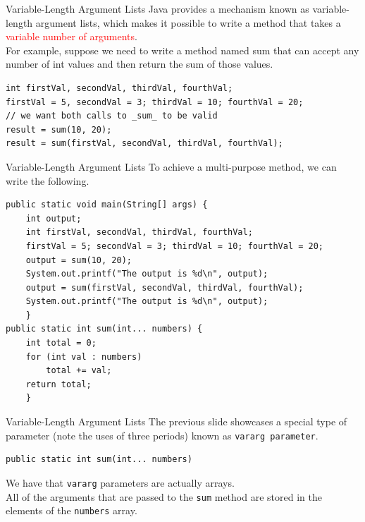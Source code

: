 \documentclass[11pt]{beamer}
\newcommand{\red}[1]{\textcolor{red}{#1}}
\begin{document}
\begin{frame}[fragile]
{Variable-Length Argument Lists}
    Java provides a mechanism known as variable-length argument lists, which makes it possible to write a method that takes a \red{variable number of arguments}. \\ \vspace{1em}
    For example, suppose we need to write a method named sum that can accept any number of int values and then return the sum of those values.
    \begin{lstlisting}
int firstVal, secondVal, thirdVal, fourthVal;
firstVal = 5, secondVal = 3; thirdVal = 10; fourthVal = 20;
// we want both calls to _sum_ to be valid
result = sum(10, 20);
result = sum(firstVal, secondVal, thirdVal, fourthVal);
    \end{lstlisting}
\end{frame}

\begin{frame}[fragile]
{Variable-Length Argument Lists}
    To achieve a multi-purpose method, we can write the following.
    \begin{lstlisting}[basicstyle=\ttfamily\footnotesize]
public static void main(String[] args) {
    int output;
    int firstVal, secondVal, thirdVal, fourthVal;
    firstVal = 5; secondVal = 3; thirdVal = 10; fourthVal = 20;
    output = sum(10, 20);
    System.out.printf("The output is %d\n", output);
    output = sum(firstVal, secondVal, thirdVal, fourthVal);
    System.out.printf("The output is %d\n", output);
    }
public static int sum(int... numbers) {
    int total = 0;
    for (int val : numbers)
        total += val;
    return total;
    }
    \end{lstlisting}
\end{frame}

\begin{frame}[fragile]
{Variable-Length Argument Lists}
    The previous slide showcases a special type of parameter (note the uses of three periods) known as \texttt{vararg parameter}.
    \begin{lstlisting}
public static int sum(int... numbers)
    \end{lstlisting}
    We have that \texttt{vararg} parameters are actually arrays. \\ \vspace{1em} 
    All of the arguments that are passed to the \texttt{sum} method are stored in the elements of the \texttt{numbers} array.
\end{frame}
\end{document}
